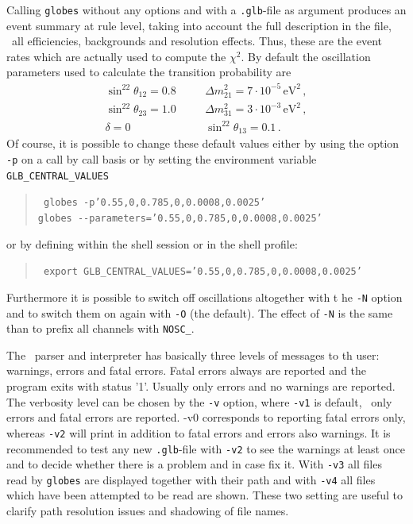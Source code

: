 Calling {\tt globes} without any options and with a {\tt .glb}-file as argument produces an event summary at rule level, taking into account 
the full description in the file, \ie\ all efficiencies, backgrounds and resolution effects. Thus, these are the event rates which are actually 
used to compute the $\chi^2$. By default the oscillation parameters used to
calculate the transition probability are
\begin{eqnarray}
\label{eq:globes_params}
\sin^22\theta_{12}=0.8&\quad&\Delta m^2_{21}=7\cdot10^{-5}
\,\mathrm{eV}^2\,,\nonumber\\
\sin^22\theta_{23}=1.0&\quad&\Delta m^2_{31}=3\cdot10^{-3}
\,\mathrm{eV}^2\,,\nonumber\\
\delta=0&\quad&\sin^22\theta_{13}=0.1\,.\
\end{eqnarray}
Of course, it is possible to change these default values either by using the
option {\tt -p} on a call by call basis or by setting the environment variable
{\tt GLB\_CENTRAL\_VALUES}
%
%
\begin{quote}
{\tt
globes -p'0.55,0,0.785,0,0.0008,0.0025'\\
globes \verb+--+parameters='0.55,0,0.785,0,0.0008,0.0025'\\
}
\end{quote}
or by defining within the shell session or in the shell profile:
\begin{quote}
{\tt
export GLB\_CENTRAL\_VALUES='0.55,0,0.785,0,0.0008,0.0025'
}
\end{quote}
Furthermore it is possible to switch off oscillations altogether with t
he {\tt -N} option
and to switch them on again with {\tt -O} (the default). The effect of {\tt -N}
is the same than to prefix all channels with {\tt NOSC\_}.



The \AEDL\ parser and interpreter has basically three levels of messages to
th user: warnings, errors and fatal errors. Fatal errors always are reported
and the program exits with status '1'. Usually only errors and no warnings
are reported. The verbosity level can be chosen by the {\tt -v} option, where
{\tt -v1} is default, \ie\ only errors and fatal errors are reported. {-v0}
corresponds to reporting fatal errors only, whereas {\tt -v2} will
print in addition to fatal errors and errors also warnings. It is recommended
to test any new {\tt .glb}-file with {\tt -v2} to see the warnings at least 
once and to decide whether there is a problem and in case fix it. With {\tt -v3}
all files read by {\tt globes} are displayed together with their path and
with  {\tt -v4} all files which have been attempted to be read are shown.
These two setting are useful to clarify path resolution issues and shadowing
of file names.




